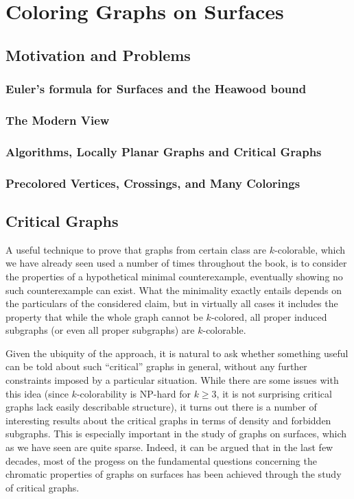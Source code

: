 \documentclass[12pt,twoside,openright,a4paper]{book}
\begin{document}
\part{Coloring Graphs on Surfaces}

\chapter{Motivation and Problems}


\section{Euler's formula for Surfaces and the Heawood bound}\label{sec:heawood}

\section{The Modern View}

\section{Algorithms, Locally Planar Graphs and Critical Graphs}

\section{Precolored Vertices, Crossings, and Many Colorings}

\chapter{Critical Graphs}

A useful technique to prove that graphs from certain class are $k$-colorable,
which we have already seen used a number of times throughout the book,
is to consider the properties of a hypothetical minimal counterexample,
eventually showing no such counterexample can exist.  What the minimality
exactly entails depends on the particulars of the considered claim, but
in virtually all cases it includes the property that while the whole graph
cannot be $k$-colored, all proper induced subgraphs (or even all proper
subgraphs) are $k$-colorable.

Given the ubiquity of the approach, it is natural to ask whether something 
useful can be told about such ``critical'' graphs in general, without any further
constraints imposed by a particular situation.  While there are some issues
with this idea (since $k$-colorability is NP-hard for $k\ge 3$, it is not surprising
critical graphs lack easily describable structure), it turns out there is a number
of interesting results about the critical graphs in terms of density and forbidden subgraphs.
This is especially important in the study of graphs on surfaces, which as we have
seen are quite sparse.  Indeed, it can be argued that in the last few decades,
most of the progess on the fundamental questions concerning the chromatic properties
of graphs on surfaces has been achieved through the study of critical graphs.
\end{document}
